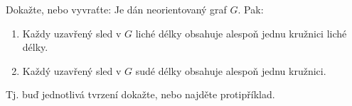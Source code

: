 \documentclass[11pt,a4paper]{article}
\begin{document}
\title{}
\author{Jakub Adamec\\XP01TGR}

\maketitle

\begin{exercise}
Dokažte, nebo vyvraťte: Je dán neorientovaný graf $G$. Pak:
\begin{enumerate}[noitemsep]
    \item Každy uzavřený sled v $G$ liché délky obsahuje alespoň jednu kružnici liché délky.
    \item Každý uzavřený sled v $G$ sudé délky obsahuje alespoň jednu kružnici.
\end{enumerate}
Tj. buď jednotlivá tvrzení dokažte, nebo najděte protipříklad.
\end{exercise}
\end{document}
